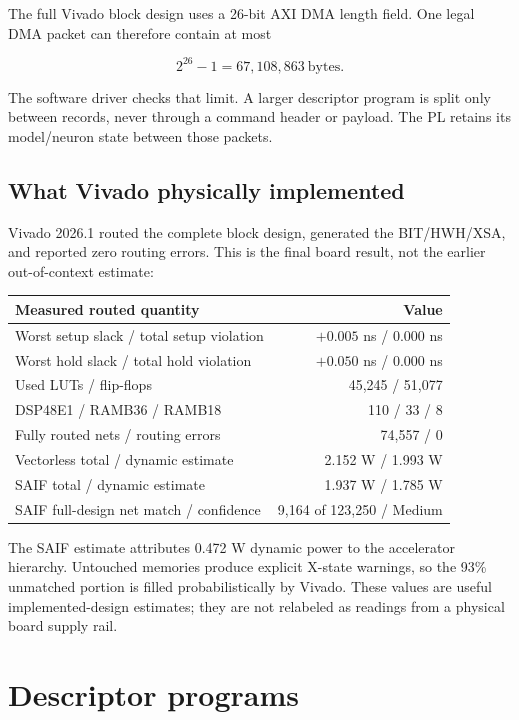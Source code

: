 \documentclass[10pt]{article}
\begin{document}
The full Vivado block design uses a 26-bit AXI DMA length field. One legal DMA
packet can therefore contain at most

\[
  2^{26}-1=67{,}108{,}863\ \text{bytes}.
\]

The software driver checks that limit. A larger descriptor program is split
only between records, never through a command header or payload. The PL retains
its model/neuron state between those packets.

\subsection{What Vivado physically implemented}

Vivado 2026.1 routed the complete block design, generated the BIT/HWH/XSA, and
reported zero routing errors. This is the final board result, not the earlier
out-of-context estimate:

\begin{center}
\begin{tabular}{lr}
\toprule
Measured routed quantity & Value\\
\midrule
Worst setup slack / total setup violation & $+0.005$ ns / $0.000$ ns\\
Worst hold slack / total hold violation & $+0.050$ ns / $0.000$ ns\\
Used LUTs / flip-flops & 45,245 / 51,077\\
DSP48E1 / RAMB36 / RAMB18 & 110 / 33 / 8\\
Fully routed nets / routing errors & 74,557 / 0\\
Vectorless total / dynamic estimate & 2.152 W / 1.993 W\\
SAIF total / dynamic estimate & 1.937 W / 1.785 W\\
SAIF full-design net match / confidence & 9,164 of 123,250 / Medium\\
\bottomrule
\end{tabular}
\end{center}

The SAIF estimate attributes 0.472 W dynamic power to the accelerator
hierarchy. Untouched memories produce explicit X-state warnings, so the 93\%
unmatched portion is filled probabilistically by Vivado. These values are
useful implemented-design estimates; they are not relabeled as readings from a
physical board supply rail.

\section{Descriptor programs}
\end{document}
